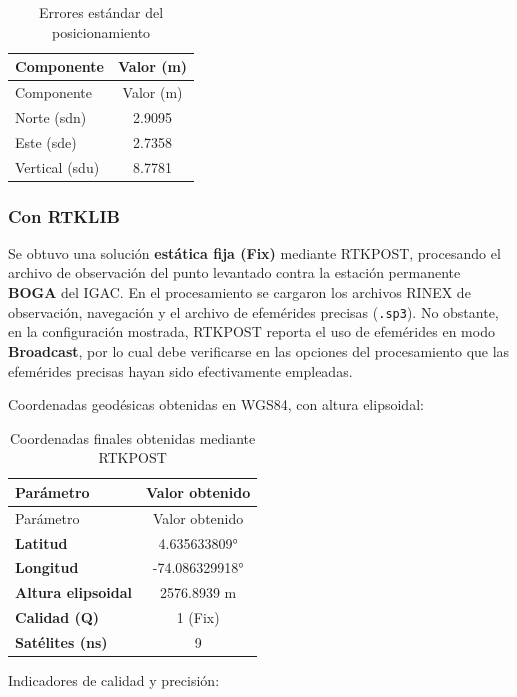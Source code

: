 \documentclass[
  letterpaper,
  DIV=11,
  numbers=noendperiod]{scrartcl}
\begin{document}
\begin{longtable}[]{@{}lc@{}}
\caption{Errores estándar del
posicionamiento}\label{tbl-precision}\tabularnewline
\toprule\noalign{}
Componente & Valor (m) \\
\midrule\noalign{}
\endfirsthead
\toprule\noalign{}
Componente & Valor (m) \\
\midrule\noalign{}
\endhead
\bottomrule\noalign{}
\endlastfoot
Norte (sdn) & 2.9095 \\
Este (sde) & 2.7358 \\
Vertical (sdu) & 8.7781 \\
\end{longtable}

\subsubsection{Con RTKLIB}\label{con-rtklib}

Se obtuvo una solución \textbf{estática fija (Fix)} mediante RTKPOST,
procesando el archivo de observación del punto levantado contra la
estación permanente \textbf{BOGA} del IGAC. En el procesamiento se
cargaron los archivos RINEX de observación, navegación y el archivo de
efemérides precisas (\texttt{.sp3}). No obstante, en la configuración
mostrada, RTKPOST reporta el uso de efemérides en modo
\textbf{Broadcast}, por lo cual debe verificarse en las opciones del
procesamiento que las efemérides precisas hayan sido efectivamente
empleadas.

Coordenadas geodésicas obtenidas en WGS84, con altura elipsoidal:

\begin{longtable}[]{@{}lc@{}}
\caption{Coordenadas finales obtenidas mediante
RTKPOST}\label{tbl-fix-results}\tabularnewline
\toprule\noalign{}
Parámetro & Valor obtenido \\
\midrule\noalign{}
\endfirsthead
\toprule\noalign{}
Parámetro & Valor obtenido \\
\midrule\noalign{}
\endhead
\bottomrule\noalign{}
\endlastfoot
\textbf{Latitud} & 4.635633809° \\
\textbf{Longitud} & -74.086329918° \\
\textbf{Altura elipsoidal} & 2576.8939 m \\
\textbf{Calidad (Q)} & 1 (Fix) \\
\textbf{Satélites (ns)} & 9 \\
\end{longtable}

Indicadores de calidad y precisión:
\end{document}
